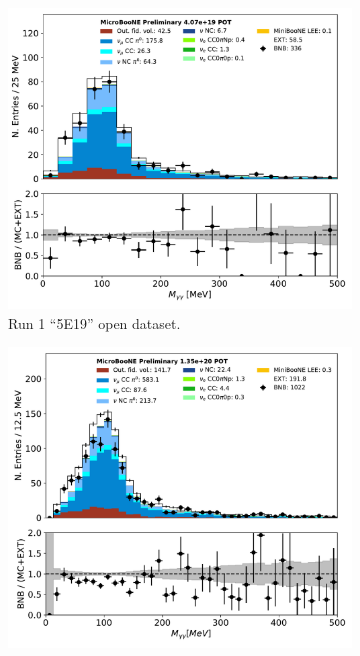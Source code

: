 \documentclass[a4paper]{article}
\begin{document}
\begin{figure}[H] 
\begin{center}
    \begin{subfigure}[b]{0.3\textwidth}
    \centering
    \includegraphics[width=1.00\textwidth]{pi0/pi0_mass_Y_01142020_5E19.pdf}
    \caption{\label{fig:pi0:mass:5E19} Run 1 ``5E19'' open dataset.}
    \end{subfigure}
    \begin{subfigure}[b]{0.3\textwidth}
    \centering
    \includegraphics[width=1.00\textwidth]{pi0/pi0_mass_Y_01142020sel__RUN1.pdf}

\end{subfigure}
\end{center}
\end{figure}
\end{document}

